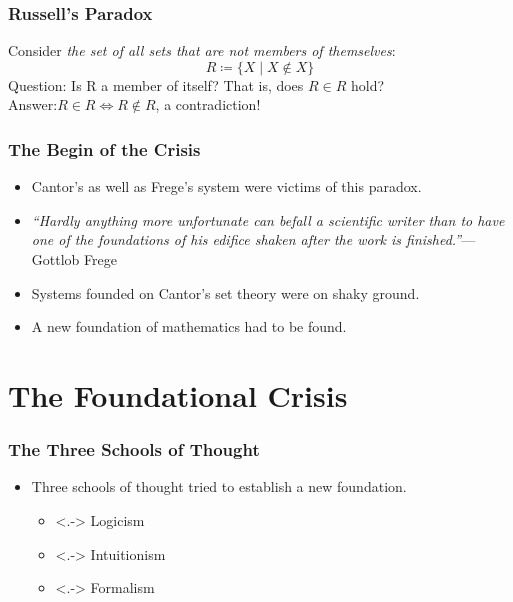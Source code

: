 \documentclass{beamer}
\begin{document}
\begin{frame}
    \frametitle{Russell's Paradox}
	Consider \textit{the set of all sets that are not members of themselves}:
	\begin{equation*}
		R\coloneqq\{X\mid X\notin X\}
	\end{equation*}\pause
	Question: Is R a member of itself? That is, does $R\in R$ hold?\pause\\
	\vspace{\baselineskip}
	Answer:\hspace{4.3em}$R\in R \iff R\notin R$, a contradiction!
\end{frame}
\begin{frame}
    \frametitle{The Begin of the Crisis}
    \begin{itemize}[<+->]
	\item Cantor's as well as Frege's system were victims of this paradox.
	\item \textit{``Hardly anything more unfortunate can befall a scientific writer than to have one of the foundations of his edifice shaken after the work is finished.''\nocite{frege_appendix}}\hfill--- Gottlob Frege
	\item Systems founded on Cantor's set theory were on shaky ground.
	\item A new foundation of mathematics had to be found.
    \end{itemize}
\end{frame}
\section{The Foundational Crisis}
\begin{frame}
    \frametitle{The Three Schools of Thought}
    \begin{itemize}[<+->]
	\item Three schools of thought tried to establish a new foundation.
	\begin{itemize}
		\item<.-> Logicism
		\item<.-> Intuitionism
		\item<.-> Formalism
	\end{itemize}
    \end{itemize}
\end{frame}
\end{document}
